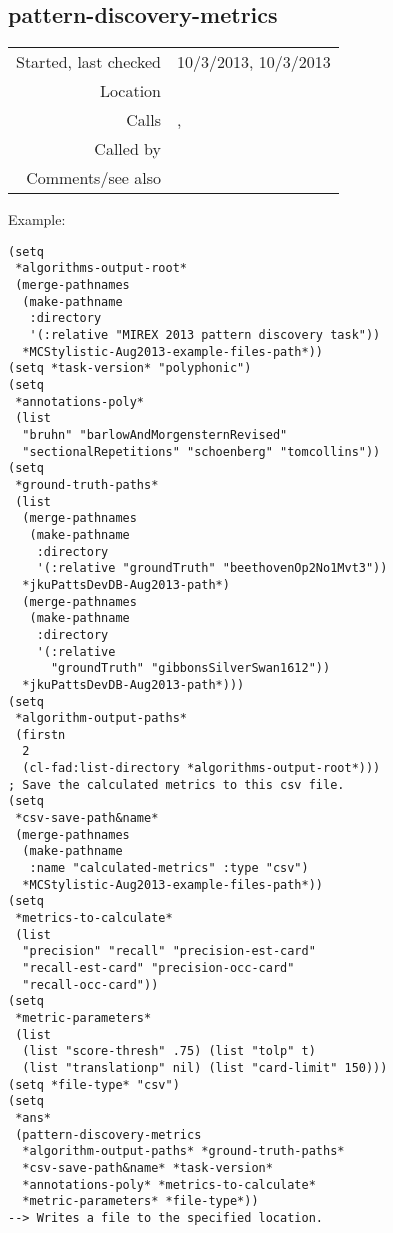 \subsection*{pattern-discovery-metrics}\label{fun:pattern-discovery-metrics}

\vspace{0.3cm}
\begin{tabular}{r|p{8cm}}
Started, last checked & 10/3/2013, 10/3/2013 \\
Location & \nameref{sec:evaluate-discovered-versus-annotated-patterns} \\
Calls & \nameref{fun:metrics-for-algorithmnpiece}, \nameref{fun:my-last} \\
Called by & \\
Comments/see also &
\end{tabular}

\vspace{0.5cm}
\noindent Example:
\begin{verbatim}
(setq
 *algorithms-output-root*
 (merge-pathnames
  (make-pathname
   :directory
   '(:relative "MIREX 2013 pattern discovery task"))
  *MCStylistic-Aug2013-example-files-path*))
(setq *task-version* "polyphonic")
(setq
 *annotations-poly*
 (list
  "bruhn" "barlowAndMorgensternRevised"
  "sectionalRepetitions" "schoenberg" "tomcollins"))
(setq
 *ground-truth-paths*
 (list
  (merge-pathnames
   (make-pathname
    :directory
    '(:relative "groundTruth" "beethovenOp2No1Mvt3"))
  *jkuPattsDevDB-Aug2013-path*)
  (merge-pathnames
   (make-pathname
    :directory
    '(:relative
      "groundTruth" "gibbonsSilverSwan1612"))
  *jkuPattsDevDB-Aug2013-path*)))
(setq
 *algorithm-output-paths*
 (firstn
  2
  (cl-fad:list-directory *algorithms-output-root*)))
; Save the calculated metrics to this csv file.
(setq
 *csv-save-path&name*
 (merge-pathnames
  (make-pathname
   :name "calculated-metrics" :type "csv")
  *MCStylistic-Aug2013-example-files-path*))
(setq
 *metrics-to-calculate*
 (list
  "precision" "recall" "precision-est-card"
  "recall-est-card" "precision-occ-card"
  "recall-occ-card"))
(setq
 *metric-parameters*
 (list
  (list "score-thresh" .75) (list "tolp" t)
  (list "translationp" nil) (list "card-limit" 150)))
(setq *file-type* "csv")
(setq
 *ans*
 (pattern-discovery-metrics
  *algorithm-output-paths* *ground-truth-paths*
  *csv-save-path&name* *task-version*
  *annotations-poly* *metrics-to-calculate*
  *metric-parameters* *file-type*))
--> Writes a file to the specified location.
\end{verbatim}

